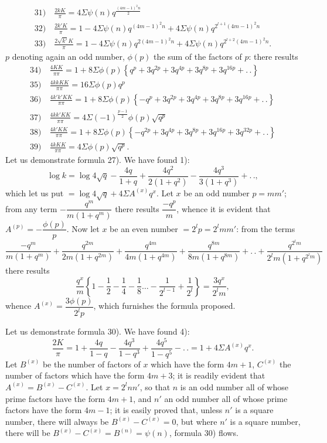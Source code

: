 \documentclass{article}
\begin{document}
\[
\begin{gathered}
\text{31)}\quad\frac{2kK}{\pi}=4\Sigma\psi(n)q^{\frac{(4m-1)^{2}n}{2}}\\[2ex]
\text{32)}\quad\frac{2k'K}{\pi}=1-4\Sigma\psi(n)q^{(4m-1)^{2}n}+4\Sigma\psi(n)q^{2^{l+1}(4m-1)^{2}n}\\[2ex]
\text{33)}\quad\frac{2\sqrt{k'}K}{\pi}=1-4\Sigma\psi(n)q^{2(4m-1)^{2}n}+4\Sigma\psi(n)q^{2^{l+2}(4m-1)^{2}n}.
\end{gathered}
\]
$p$ denoting again an odd number, $\phi(p)$ the sum of the factors of $p$: there results
\[
\begin{gathered}
\text{34)}\quad\frac{4KK}{\pi\pi}=1+8\Sigma\phi(p)\left\{q^{p}+3q^{2p}+3q^{4p}+3q^{8p}+3q^{16p}+.\,.\right\}\\[2ex]
\text{35)}\quad\frac{4kkKK}{\pi\pi}=16\Sigma\phi(p)q^{p}\\[2ex]
\text{36)}\quad\frac{4k'k'KK}{\pi\pi}=1+8\Sigma\phi(p)\left\{-q^{p}+3q^{2p}+3q^{4p}+3q^{8p}+3q^{16p}+.\,.\right\}\\[2ex]
\text{37)}\quad\frac{4kk'KK}{\pi\pi}=4\Sigma(-1)^{\frac{p-1}{2}}\phi(p)\sqrt{q^{p}}\\[2ex]
\text{38)}\quad\frac{4k'KK}{\pi\pi}=1+8\Sigma\phi(p)\left\{-q^{2p}+3q^{4p}+3q^{8p}+3q^{16p}+3q^{32p}+.\,.\right\}\\[2ex]
\text{39)}\quad\frac{4kKK}{\pi\pi}=4\Sigma\phi(p)\sqrt{q^{p}}.
\end{gathered}
\]
Let us demonstrate formula 27). We have found 1):
\[
\log k=\log4\sqrt{q}-\frac{4q}{1+q}+\frac{4q^{2}}{2(1+q^{2})}-\frac{4q^{3}}{3(1+q^{3})}+.\,.,
\]
which let us put $=\log4\sqrt{q}+4\Sigma A^{(x)}q^{x}$. Let $x$ be an odd number $p=mm'$; from any term $-\dfrac{q^{m}}{m(1+q^{m})}$ there results $\dfrac{-q^{p}}{m}$, whence it is evident that $A^{(p)}=-\dfrac{\phi(p)}{p}$. Now let $x$ be an even number $=2^{l}p=2^{l}mm'$: from the terms
\[
\frac{-q^{m}}{m(1+q^{m})}+\frac{q^{2m}}{2m(1+q^{2m})}+\frac{q^{4m}}{4m(1+q^{4m})}+\frac{q^{8m}}{8m(1+q^{8m})}+.\,.+\frac{q^{2^{l}m}}{2^{l}m(1+q^{2^{l}m})}
\]
there results
\[
\frac{q^{x}}{m}\left\{1-\frac{1}{2}-\frac{1}{4}-\frac{1}{8}\ldots-\frac{1}{2^{l-1}}+\frac{1}{2^{l}}\right\}=\frac{3q^{x}}{2^{l}m},
\]
whence $A^{(x)}=\dfrac{3\phi(p)}{2^{l}p}$, which furnishes the formula proposed.

Let us demonstrate formula 30). We have found 4):
\[
\frac{2K}{\pi}=1+\frac{4q}{1-q}-\frac{4q^{3}}{1-q^{3}}+\frac{4q^{5}}{1-q^{5}}-.\,.=1+4\Sigma A^{(x)}q^{x}.
\]
Let $B^{(x)}$ be the number of factors of $x$ which have the form $4m+1$, $C^{(x)}$ the number of factors which have the form $4m+3$; it is readily evident that $A^{(x)}=B^{(x)}-C^{(x)}$. Let $x=2^{l}nn'$, so that $n$ is an odd number all of whose prime factors have the form $4m+1$, and $n'$ an odd number all of whose prime factors have the form $4m-1$; it is easily proved that, unless $n'$ is a square number, there will always be $B^{(x)}-C^{(x)}=0$, but where $n'$ is a square number, there will be $B^{(x)}-C^{(x)}=B^{(n)}=\psi(n)$, formula 30) flows.
\end{document}
